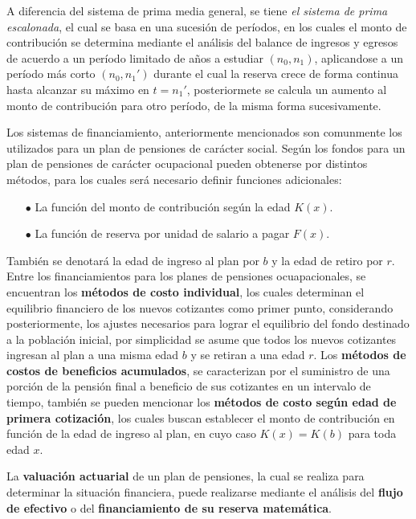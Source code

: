 \documentclass[12pt,letterpaper,titlepage]{article}
\begin{document}
A diferencia del sistema de prima media general, se tiene \textit{el sistema de prima escalonada}, el cual se basa en una sucesión de períodos, en los cuales el monto de contribución se determina mediante el análisis del balance de ingresos y egresos de acuerdo a un período limitado de años a estudiar $(n_{0}, n_{1})$, aplicandose a un período más corto $(n_{0}, n_{1}')$ durante el cual la reserva crece de forma continua hasta alcanzar su máximo en $t=n_{1}'$, posteriormete se calcula un aumento al monto de contribución para otro período, de la misma forma sucesivamente.

Los sistemas de financiamiento, anteriormente mencionados son comunmente los utilizados para un plan de pensiones de carácter social. Según \cite{778} los fondos para un plan de pensiones de carácter ocupacional pueden obtenerse por distintos métodos, para los cuales será necesario definir funciones adicionales:

\begin{itemize}
	\item [$\bullet$] La función del monto de contribución según la edad $K(x)$.
	\item [$\bullet$] La función de reserva por unidad de salario a pagar $F(x)$.
\end{itemize}

También se denotará la edad de ingreso al plan por $b$ y la edad de retiro por $r$. Entre los financiamientos para los planes de pensiones ocuapacionales, se encuentran los \textbf{métodos de costo individual}, los cuales determinan el equilibrio financiero de los nuevos cotizantes como primer punto, considerando posteriormente, los ajustes necesarios para lograr el equilibrio del fondo destinado a la población inicial, por simplicidad se asume que todos los nuevos cotizantes ingresan al plan a una misma edad $b$ y se retiran a una edad $r$. Los \textbf{métodos de costos de beneficios acumulados}, se caracterizan por el suministro de una porción de la pensión final a beneficio de sus cotizantes en un intervalo de tiempo, también se pueden mencionar los \textbf{métodos de costo según edad de primera cotización}, los cuales buscan establecer el monto de contribución en función de la edad de ingreso al plan, en cuyo caso $K(x)=K(b)$ para toda edad $x$.


La \textbf{valuación actuarial} de un plan de pensiones, la cual se realiza para determinar la situación financiera, puede realizarse mediante el análisis del \textbf{flujo de efectivo} o del \textbf{financiamiento de su reserva matemática}.
\end{document}
